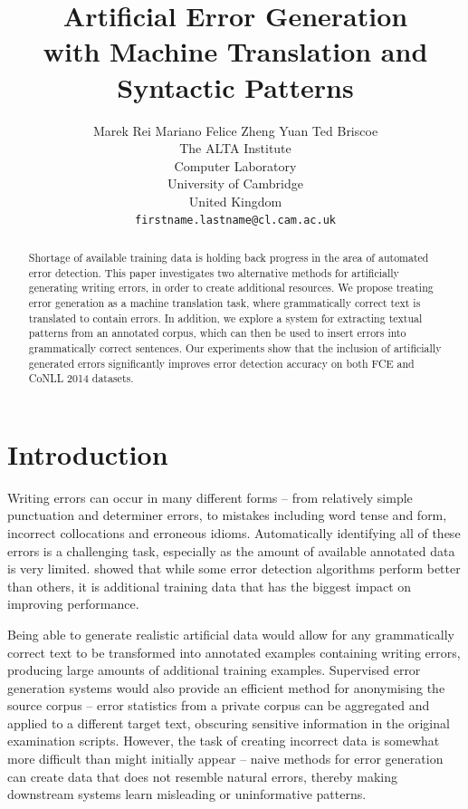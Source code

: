 \documentclass[11pt,letterpaper]{article}
\title{Artificial Error Generation \\with Machine Translation and Syntactic Patterns}
\author{Marek Rei \hspace{1cm} Mariano Felice \hspace{1cm} Zheng Yuan \hspace{1cm} Ted Briscoe\\
	    The ALTA Institute\\
	    Computer Laboratory\\
	    University of Cambridge\\
        United Kingdom\\
	    {\tt firstname.lastname@cl.cam.ac.uk} \\}
\date{}
\begin{document}
\maketitle

\begin{abstract}
Shortage of available training data is holding back progress in the area of automated error detection.
This paper investigates two alternative methods for artificially generating writing errors, in order to create additional resources.
We propose treating error generation as a machine translation task, where grammatically correct text is translated to contain errors.
In addition, we explore a system for extracting textual patterns from an annotated corpus, which can then be used to insert errors into grammatically correct sentences.
Our experiments show that the inclusion of artificially generated errors significantly improves error detection accuracy on both FCE and CoNLL 2014 datasets.
\end{abstract}



\section{Introduction}
Writing errors can occur in many different forms -- from relatively simple punctuation and determiner errors, to mistakes including word tense and form, incorrect collocations and erroneous idioms. %
Automatically identifying all of these errors is a challenging task, especially as the amount of available annotated data is very limited. 
 showed that while some error detection algorithms perform better than others, it is additional training data that has the biggest impact on improving performance.

Being able to generate realistic artificial data would allow for any grammatically correct text to be transformed into annotated examples containing writing errors, producing large amounts of additional training examples.
Supervised error generation systems would also provide an efficient method for anonymising the source corpus -- error statistics from a private corpus can be aggregated and applied to a different target text, obscuring sensitive information in the original examination scripts.
However, the task of creating incorrect data is somewhat more difficult than might initially appear -- naive methods for error generation can create data that does not resemble natural errors, thereby making downstream systems learn misleading or uninformative patterns.
\end{document}
